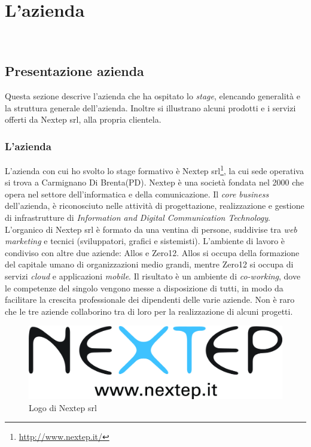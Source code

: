 
\chapter{L'azienda}
\label{cap:azienda}
\\




\section{Presentazione azienda}
Questa sezione descrive l'azienda che ha ospitato lo \emph{stage}, elencando generalità e la struttura generale dell'azienda. Inoltre si illustrano alcuni prodotti e i servizi offerti da Nextep srl, alla propria clientela.

\subsection{L'azienda}
L'azienda con cui ho svolto lo stage formativo è Nextep srl\footnote{\url{http://www.nextep.it/}}, la cui sede operativa si trova a Carmignano Di Brenta(PD). Nextep è una società fondata nel 2000 che opera nel settore dell'informatica e della comunicazione. Il \emph{\gls{core business}} dell'azienda, è riconosciuto nelle attività di progettazione, realizzazione e gestione di infrastrutture di \emph{Information and Digital Communication Technology}. L'organico di Nextep srl è formato da una ventina di persone, suddivise tra \emph{web marketing} e tecnici (sviluppatori, grafici e sistemisti). L'ambiente di lavoro è condiviso con altre due aziende: Allos  e Zero12. Allos si occupa della formazione del capitale umano di organizzazioni medio grandi, mentre Zero12  si occupa di servizi \emph{cloud} e applicazioni \emph{mobile}. Il risultato è un ambiente di \emph{co-working}, dove le competenze del singolo vengono messe a disposizione di tutti, in modo da facilitare la crescita professionale dei dipendenti delle varie aziende. Non è raro che le tre aziende collaborino tra di loro per la realizzazione di alcuni progetti.
\begin{figure}[h]
\centering
\includegraphics[scale=0.20]{immagini/logo_nextep}
\caption{Logo di Nextep srl}
\label{fig:logo_nextep}
\end{figure}

